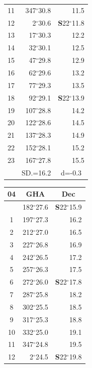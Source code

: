 \documentclass[10pt, a4paper]{report}
\begin{document}
\begin{scriptsize}
\begin{tabular*}{0.2\textwidth}[t]{@{\extracolsep{\fill}}|c|rr|}
11 & 347$^\circ$30.8 & 11.5\\[2Pt]
12 & 2$^\circ$30.6 & \textbf{S}22$^\circ$11.8\\
13 & 17$^\circ$30.3 & 12.2\\
14 & 32$^\circ$30.1 & 12.5\\
15 & 47$^\circ$29.8 & \raisebox{0.24ex}{\boldmath$\cdot$~\boldmath$\cdot$~~}12.9\\
16 & 62$^\circ$29.6 & 13.2\\
17 & 77$^\circ$29.3 & 13.5\\[2Pt]
18 & 92$^\circ$29.1 & \textbf{S}22$^\circ$13.9\\
19 & 107$^\circ$28.8 & 14.2\\
20 & 122$^\circ$28.6 & 14.5\\
21 & 137$^\circ$28.3 & \raisebox{0.24ex}{\boldmath$\cdot$~\boldmath$\cdot$~~}14.9\\
22 & 152$^\circ$28.1 & 15.2\\
23 & 167$^\circ$27.8 & 15.5\\
\hline
\rule{0pt}{2.4ex} & \multicolumn{1}{c}{SD.=16.2} & \multicolumn{1}{c|}{d=-0.3}\\
\hline
\end{tabular*}\noindent
\begin{tabular*}{0.2\textwidth}[t]{@{\extracolsep{\fill}}|c|rr|}
\hline
\multicolumn{1}{|c|}{\rule{0pt}{2.6ex}\textbf{04}} & \multicolumn{1}{c}{\textbf{GHA}} & \multicolumn{1}{c|}{\textbf{Dec}}\\
\hline\rule{0pt}{2.6ex}\noindent
0 & 182$^\circ$27.6 & \textbf{S}22$^\circ$15.9\\
1 & 197$^\circ$27.3 & 16.2\\
2 & 212$^\circ$27.0 & 16.5\\
3 & 227$^\circ$26.8 & \raisebox{0.24ex}{\boldmath$\cdot$~\boldmath$\cdot$~~}16.9\\
4 & 242$^\circ$26.5 & 17.2\\
5 & 257$^\circ$26.3 & 17.5\\[2Pt]
6 & 272$^\circ$26.0 & \textbf{S}22$^\circ$17.8\\
7 & 287$^\circ$25.8 & 18.2\\
8 & 302$^\circ$25.5 & 18.5\\
9 & 317$^\circ$25.3 & \raisebox{0.24ex}{\boldmath$\cdot$~\boldmath$\cdot$~~}18.8\\
10 & 332$^\circ$25.0 & 19.1\\
11 & 347$^\circ$24.8 & 19.5\\[2Pt]
12 & 2$^\circ$24.5 & \textbf{S}22$^\circ$19.8\\

\end{tabular*}
\end{scriptsize}
\end{document}
